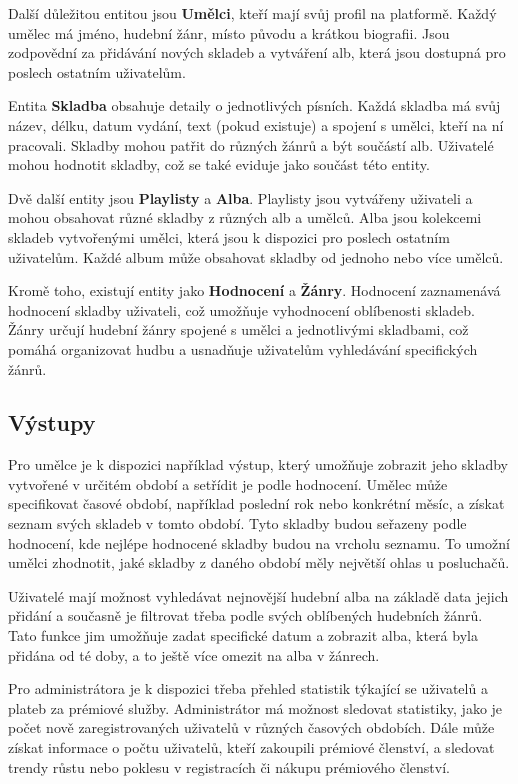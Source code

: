 \documentclass[czech,12pt,a4paper,titlepage]{article}
\begin{document}
    Další důležitou entitou jsou \textbf{Umělci}, kteří mají svůj profil na platformě.
    Každý umělec má jméno, hudební žánr, místo původu a krátkou biografii.
    Jsou zodpovědní za přidávání nových skladeb a vytváření alb, která jsou dostupná pro poslech ostatním uživatelům.


    Entita \textbf{Skladba} obsahuje detaily o jednotlivých písních.
    Každá skladba má svůj název, délku, datum vydání, text (pokud existuje) a spojení s umělci, kteří na ní pracovali.
    Skladby mohou patřit do různých žánrů a být součástí alb.
    Uživatelé mohou hodnotit skladby, což se také eviduje jako součást této entity.


    Dvě další entity jsou \textbf{Playlisty} a \textbf{Alba}.
    Playlisty jsou vytvářeny uživateli a mohou obsahovat různé skladby z různých alb a umělců.
    Alba jsou kolekcemi skladeb vytvořenými umělci, která jsou k dispozici pro poslech ostatním uživatelům.
    Každé album může obsahovat skladby od jednoho nebo více umělců.


    Kromě toho, existují entity jako \textbf{Hodnocení} a \textbf{Žánry}.
    Hodnocení zaznamenává hodnocení skladby uživateli, což umožňuje vyhodnocení oblíbenosti skladeb.
    Žánry určují hudební žánry spojené s umělci a jednotlivými skladbami, což pomáhá organizovat hudbu a usnadňuje uživatelům vyhledávání specifických žánrů.

    \clearpage

    \subsection*{Výstupy}
    Pro umělce je k dispozici například výstup, který umožňuje zobrazit jeho skladby vytvořené v určitém období a setřídit je podle hodnocení.
    Umělec může specifikovat časové období, například poslední rok nebo konkrétní měsíc, a získat seznam svých skladeb v tomto období.
    Tyto skladby budou seřazeny podle hodnocení, kde nejlépe hodnocené skladby budou na vrcholu seznamu.
    To umožní umělci zhodnotit, jaké skladby z daného období měly největší ohlas u posluchačů.

    Uživatelé mají možnost vyhledávat nejnovější hudební alba na základě data jejich přidání a současně je filtrovat třeba podle svých oblíbených hudebních žánrů.
    Tato funkce jim umožňuje zadat specifické datum a zobrazit alba, která byla přidána od té doby, a to ještě více omezit na alba v žánrech.


    Pro administrátora je k dispozici třeba přehled statistik týkající se uživatelů a plateb za prémiové služby.
    Administrátor má možnost sledovat statistiky, jako je počet nově zaregistrovaných uživatelů v různých časových obdobích.
    Dále může získat informace o počtu uživatelů, kteří zakoupili prémiové členství, a sledovat trendy růstu nebo poklesu v registracích či nákupu prémiového členství.
\end{document}
